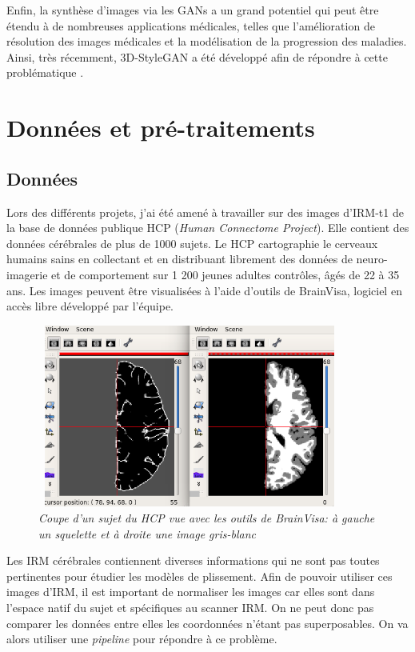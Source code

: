 \documentclass[12pt, oneside, a4paper, titlepage]{article}
\begin{document}
Enfin, la synthèse d'images via les GANs a un grand potentiel  qui peut être étendu à de nombreuses applications médicales, telles que l'amélioration de résolution des images médicales et la modélisation de la progression des maladies. Ainsi, très récemment,  3D-StyleGAN a été développé afin de répondre à cette problématique \cite{hong_3d-stylegan_2021}.


\newpage

\section{Données et pré-traitements}

\subsection{Données}
Lors des différents projets, j'ai été amené à travailler sur des images d'IRM-t1 de la base de données publique HCP (\textit{Human Connectome Project}). Elle contient des données cérébrales de plus de 1000 sujets. Le HCP cartographie le cerveaux humains sains en collectant et en distribuant librement des données de neuro-imagerie et de comportement sur 1 200 jeunes adultes contrôles, âgés de 22 à 35 ans. Les images peuvent être visualisées à l'aide d'outils de BrainVisa, logiciel en accès libre développé par l'équipe. 


\begin{figure}[H]
    \centering
    \includegraphics[width=10cm, height=6cm]{hcp.png}
    \caption{\textit{Coupe d'un sujet du HCP vue avec les outils de BrainVisa: à gauche un squelette et à droite une image gris-blanc}}
    \label{fig:anatomist}
\end{figure}

\vspace{5mm} 
Les IRM cérébrales contiennent diverses informations qui ne sont pas toutes pertinentes pour étudier les modèles de plissement. Afin de pouvoir utiliser ces images d'IRM, il est important de normaliser les images car elles sont dans l'espace natif du sujet et spécifiques au scanner IRM. On ne peut donc pas comparer les données entre elles les coordonnées n'étant pas superposables. On va alors utiliser une \textit{pipeline} pour répondre à ce problème.\\
\end{document}
